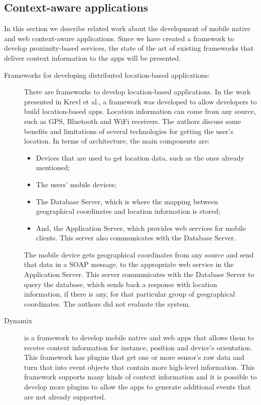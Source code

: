 \subsection{Context-aware applications}
\label{sub:frameworks_context_aware}
In this section we describe related work about the
development of mobile native and web
context-aware applications.
Since we have created a framework to develop
proximity-based services, the state
of the art of existing frameworks that deliver
context information to the apps will be presented.
\begin{description}
  \item[Frameworks for developing distributed
  location-based applications:]
  There are frameworks to develop location-based
  applications.
  In the work presented in Krevl et al.\cite{Krevl2006},
  a framework
  was developed to allow developers to build
  location-based apps. Location information can come
  from any source, such as \gls{GPS}, Bluetooth and \gls{WiFi} receivers.
  The authors discuss some benefits and limitations
  of several technologies for getting the
  user's location.
  In terms of architecture, the main components
  are:
  \begin{itemize}
  \item
  Devices that are used to get location data, such as
  the ones already mentioned;
  \item The users' mobile devices;
  \item The Database Server, which is where the mapping
  between geographical coordinates and location
  information is stored;
  \item And, the Application Server, which provides web services for
  mobile clients.
  This server also communicates
  with the Database Server.
  \end{itemize}
  The mobile device gets geographical coordinates
  from any source and send that data in a
  \gls{SOAP}\cite{Seely:2001:SCP:560836} message,
  to the appropriate web service in the Application
  Server. This server communicates with the Database Server
  to query the database, which sends back a response with
  location information, if there is any, for that
  particular group of geographical coordinates.
  The authors did not evaluate the system.
  \item[Dynamix\cite{dynamix}]
  is a framework to develop
  mobile native and web apps that allows them to receive
  context information for instance, position and device's
  orientation. This framework has plugins that get
  one or more sensor's raw data and turn that into event
  objects that contain more high-level information.
  This framework supports many kinds of context information
  and it is possible to develop more plugins to allow the
  apps to generate additional events that are not
  already supported.
\end{description}

